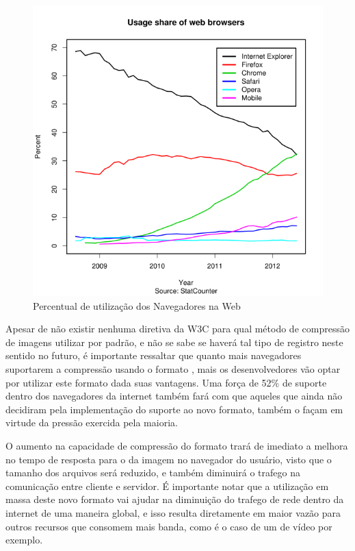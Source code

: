 \documentclass[espaco=simples,appendix=Name]{abnt}
\begin{document}
\begin{figure}[h]
  \centering
    \includegraphics[scale=0.5]{BrowserCounter.png}
  \caption{Percentual de utilização dos Navegadores na Web \protect\cite{BrowserStats}}
\end{figure}

Apesar de não existir nenhuma diretiva da W3C para qual método de compressão de imagens utilizar por padrão, e não se sabe se haverá tal tipo de registro neste sentido no futuro, é importante ressaltar que quanto mais navegadores suportarem a compressão usando o formato , mais os desenvolvedores vão optar por utilizar este formato dada suas vantagens. Uma força de 52\% de suporte dentro dos navegadores da internet também fará com que aqueles que ainda não decidiram pela implementação do suporte ao novo formato, também o façam em virtude da pressão exercida pela maioria.

O aumento na capacidade de compressão do formato  trará de imediato a melhora no tempo de resposta para o  da imagem no navegador do usuário, visto que o tamanho dos arquivos será reduzido, e também diminuirá o trafego na comunicação entre cliente e servidor. É importante notar que a utilização em massa deste novo formato vai ajudar na diminuição do trafego de rede dentro da internet de uma maneira global, e isso resulta diretamente em maior vazão para outros recursos que consomem mais banda, como é o caso de um  de vídeo por exemplo.
\end{document}
